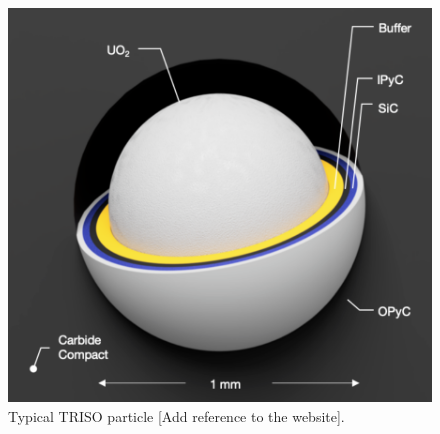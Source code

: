 \documentclass[11pt,letterpaper]{article}
\begin{document}
	\begin{figure}[]
		\centering
		\includegraphics[width=0.5\linewidth]{figures/triso1.png}
		\hfill
		\caption{Typical TRISO particle [Add reference to the website].}
		\label{fig:triso}
	\end{figure}
\end{document}
